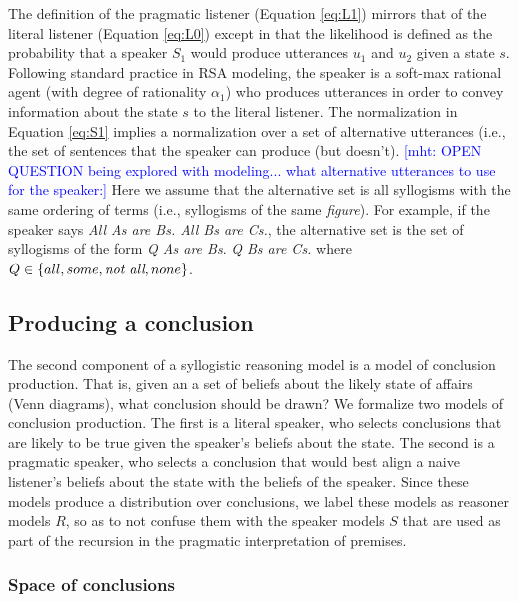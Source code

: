 \documentclass[floatsintext, doc]{apa6}
\newcommand{\mht}[1]{{\textcolor{Blue}{[mht: #1]}}}
\begin{document}
The definition of the pragmatic listener (Equation \ref{eq:L1}) mirrors that of the literal listener (Equation \ref{eq:L0}) except in that the likelihood is defined as the probability that a speaker $S_1$ would produce utterances $u_1$ and $u_2$ given a state $s$.
Following standard practice in RSA modeling, the speaker is a soft-max rational agent (with degree of rationality $\alpha_1$) who produces utterances in order to convey information about the state $s$ to the literal listener.
The normalization in Equation \ref{eq:S1} implies a normalization over a set of alternative utterances (i.e., the set of sentences that the speaker can produce (but doesn't). 
\mht{OPEN QUESTION being explored with modeling... what alternative utterances to use for the speaker:}
Here we assume that the alternative set is all syllogisms with the same ordering of terms (i.e., syllogisms of the same \emph{figure}). For example, if the speaker says \emph{All As are Bs. All Bs are Cs.}, the alternative set is the set of syllogisms of the form \emph{Q As are Bs}. \emph{Q Bs are Cs.} where $Q \in \{all, some, \emph{not all}, none\}$. 

\subsection{Producing a conclusion}

The second component of a syllogistic reasoning model is a model of conclusion production. 
That is, given an a set of beliefs about the likely state of affairs (Venn diagrams), what conclusion should be drawn?
We formalize two models of conclusion production.
The first is a literal speaker, who selects conclusions that are likely to be true given the speaker's beliefs about the state. 
The second is a pragmatic speaker, who selects a conclusion that would best align a naive listener's beliefs about the state with the beliefs of the speaker.
Since these models produce a distribution over conclusions, we label these models as reasoner models $R$, so as to not confuse them with the speaker models $S$ that are used as part of the recursion in the pragmatic interpretation of premises.

\subsubsection{Space of conclusions}
\end{document}
